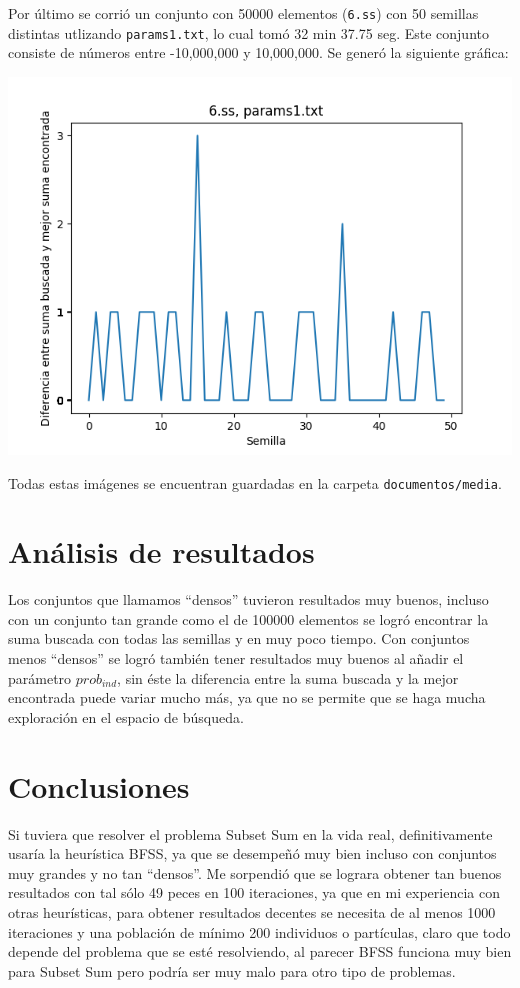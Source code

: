 \documentclass[12pt]{article}
\begin{document}
Por último se corrió un conjunto con 50000 elementos (\texttt{6.ss}) con 50 semillas distintas utlizando \texttt{params1.txt}, lo cual tomó 32 min 37.75 seg. Este conjunto consiste de números entre -10,000,000 y 10,000,000. Se generó la siguiente gráfica:

\begin{center}
  \includegraphics[scale=0.6]{media/6p1} \\
\end{center}

Todas estas imágenes se encuentran guardadas en la carpeta \texttt{documentos/media}.

\section{Análisis de resultados}
Los conjuntos que llamamos ``densos'' tuvieron resultados muy buenos, incluso con un conjunto tan grande como el de 100000 elementos se logró encontrar la suma buscada con todas las semillas y en muy poco tiempo. Con conjuntos menos ``densos'' se logró también tener resultados muy buenos al añadir el parámetro $prob_{ind}$, sin éste la diferencia entre la suma buscada y la mejor encontrada puede variar mucho más, ya que no se permite que se haga mucha exploración en el espacio de búsqueda.

\section{Conclusiones}
Si tuviera que resolver el problema Subset Sum en la vida real, definitivamente usaría la heurística BFSS, ya que se desempeñó muy bien incluso con conjuntos muy grandes y no tan ``densos''. Me sorpendió que se lograra obtener tan buenos resultados con tal sólo 49 peces en 100 iteraciones, ya que en mi experiencia con otras heurísticas, para obtener resultados decentes se necesita de al menos 1000 iteraciones y una población de mínimo 200 individuos o partículas, claro que todo depende del problema que se esté resolviendo, al parecer BFSS funciona muy bien para Subset Sum pero podría ser muy malo para otro tipo de problemas. \\
\end{document}
